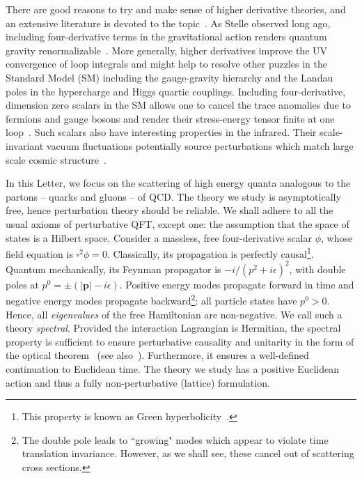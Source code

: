 \documentclass[pra,aps,amsmath,amssymb,notitlepage, twocolumn,superscriptaddress,longbibliography,nofootinbib,floatfix,10pt]{revtex4-2}
\begin{document}
There are good reasons to try and make sense of higher derivative theories, and an extensive literature is devoted to the topic~\cite{Flato:1981iy,*Binegar:1984pb,*binegar1982state,Hawking:2001yt,Rivelles_2003,Bender:2008zz,Mostafazadeh_2010_PU,Mannheim:2011ds,maldacena2011einstein,ErrastiDiez:2024hfq,fring2026spectrumgeneratingalgebraintertwinersresonant}.  As Stelle observed long ago, including four-derivative terms in the gravitational action renders quantum gravity renormalizable~\cite{Stelle:1976gc}. 
More generally, higher derivatives improve the UV convergence of loop integrals and might help to resolve other puzzles in the Standard Model (SM) including the gauge-gravity hierarchy and the Landau poles in the hypercharge and Higgs quartic couplings.  Including four-derivative, dimension zero scalars in the SM allows one to cancel the trace anomalies due to fermions and gauge bosons and render their stress-energy tensor finite at one loop~\cite{Boyle:2021jaz,Boyle:2025bxf}. Such scalars also have interesting properties in the infrared. Their scale-invariant vacuum fluctuations potentially source perturbations which match large scale cosmic structure~\cite{Turok:2023amx}. 

In this Letter, we focus on the scattering of high energy quanta analogous to the partons -- quarks and gluons -- of QCD. The theory we study is asymptotically free, hence perturbation theory should be reliable. We shall adhere to all the usual axioms of perturbative QFT, except one: the assumption that the space of states is a Hilbert space. Consider a massless, free four-derivative scalar $\phi$, whose field equation is $\square^2 \phi=0$. Classically, its propagation is perfectly causal\footnote{This property is known as  Green hyperbolicity~\cite{bar2015green}.}. Quantum mechanically, its Feynman propagator is $-i/(p^2+i \epsilon)^2$, with double poles at $p^0=\pm (|\mathbf{p}|-i \epsilon)$. Positive energy modes propagate forward in time and negative energy modes propagate backward\footnote{The double pole leads to ``growing" modes which appear to violate time translation invariance. However, as we shall see, these cancel out of scattering cross sections.}: all particle states have $p^0>0$. Hence, all {\it eigenvalues} of the free Hamiltonian are non-negative. We call such a theory {\it spectral}. Provided the interaction Lagrangian is Hermitian, the spectral property is sufficient to ensure perturbative causality and unitarity in the form of the optical theorem~\cite{tHooft:186259} (see also~\cite{BTlong}). Furthermore, it ensures a well-defined continuation to Euclidean time. The theory we study has a positive Euclidean action and thus a fully non-perturbative (lattice) formulation.
\end{document}
